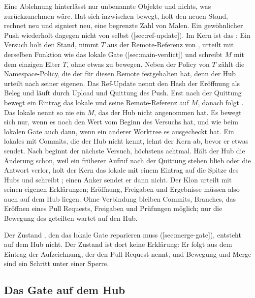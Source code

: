 Eine Ablehnung hinterlässt nur unbenannte Objekte und nichts, was zurückzunehmen wäre.
Hat sich  inzwischen bewegt, holt  den neuen Stand, rechnet neu und
signiert neu, eine begrenzte Zahl von Malen.
Ein gewöhnlicher Push wiederholt dagegen nicht von selbst
([sec:ref-update]).
Im Kern ist das : Ein Versuch holt den Stand, nimmt $T$ aus der
Remote-Referenz von , urteilt mit derselben Funktion wie das lokale Gate
([sec:main-verdict]) und schreibt $M$ mit dem einzigen Elter $T$, ohne etwas zu
bewegen.
Neben der Policy von $T$ zählt die Namespace-Policy, die der  für diesen Remote
festgehalten hat, denn der Hub urteilt nach seiner eigenen.
Das Ref-Update nennt den Hash der Eröffnung als Beleg und läuft durch Upload und Quittung des
Push.
Erst nach der Quittung bewegt ein Eintrag  das lokale  und seine
Remote-Referenz auf $M$, danach folgt .
Das lokale  nennt so nie ein $M$, das der Hub nicht angenommen hat.
Es bewegt sich nur, wenn es noch den Wert vom Beginn des Versuchs hat, und wie beim lokalen
Gate auch dann, wenn ein anderer Worktree es ausgecheckt hat.
Ein lokales  mit Commits, die der Hub nicht kennt, lehnt der Kern ab, bevor er etwas
sendet.
Nach  beginnt der nächste Versuch, höchstens achtmal.
Hält der Hub die Änderung schon, weil ein früherer Aufruf nach der Quittung stehen blieb oder
die Antwort verlor, holt der Kern das lokale  mit einem Eintrag  auf
die Spitze des Hubs und schreibt ; einen Anker sendet er dann nicht.
Der Klon urteilt mit seinen eigenen Erklärungen; Eröffnung, Freigaben und Ergebnisse müssen also
auch auf dem Hub liegen.
Ohne Verbindung bleiben Commits, Branches, das Eröffnen eines Pull Requests, Freigaben und
Prüfungen möglich; nur die Bewegung des geteilten  wartet auf den Hub.

Der Zustand , den das lokale Gate
reparieren muss ([sec:merge-gate]), entsteht auf dem Hub nicht.
Der Zustand  ist dort keine Erklärung: Er folgt aus dem Eintrag der Aufzeichnung,
der den Pull Request nennt, und Bewegung und Merge sind ein Schritt unter einer Sperre.

\subsection[sec:hub-gate]{Das Gate auf dem Hub}

